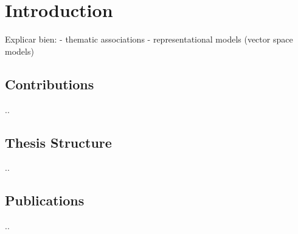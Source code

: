 

\chapter{Introduction}\label{ch:introduction}

\graphicspath{{introduction/figures/}}


Explicar bien: 
- thematic associations
- representational models (vector space models)


\section{Contributions}
..

\section{Thesis Structure}
..

\section{Publications}
..

